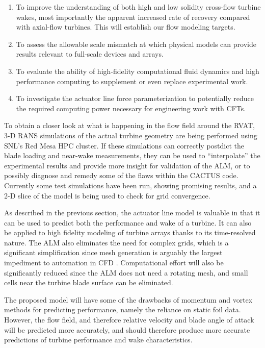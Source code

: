 \begin{enumerate}

	\item To improve the understanding of both high and low solidity cross-flow
    turbine wakes, most importantly the apparent increased rate of recovery
    compared with axial-flow turbines. This will establish our flow modeling
    targets.
	
	\item To assess the allowable scale mismatch at which physical models can
	provide results relevant to full-scale devices and arrays.
	
	\item To evaluate the ability of high-fidelity computational fluid dynamics and
	high performance computing to supplement or even replace experimental work.
    
    \item To investigate the actuator line force parameterization to potentially
    reduce the required computing power necessary for engineering work with
    CFTs.
\end{enumerate}

To obtain a closer look at what is happening in the flow field around the RVAT,
3-D RANS simulations of the actual turbine geometry are being performed using
SNL's Red Mesa HPC cluster. If these simulations can correctly postdict the
blade loading and near-wake measurements, they can be used to ``interpolate''
the experimental results and provide more insight for validation of the ALM, or
to possibly diagnose and remedy some of the flaws within the CACTUS code.
Currently some test simulations have been run, showing promising results, and a
2-D slice of the model is being used to check for grid convergence.

As described in the previous section, the actuator line model is valuable in
that it can be used to predict both the performance and wake of a turbine. It
can also be applied to high fidelity modeling of turbine arrays thanks to its
time-resolved nature. The ALM also eliminates the need for complex grids, which
is a significant simplification since mesh generation is arguably the largest
impediment to automation in CFD \cite{Slotnick2014}. Computational effort will
also be significantly reduced since the ALM does not need a rotating mesh, and
small cells near the turbine blade surface can be eliminated.

The proposed model will have some of the drawbacks of momentum and vortex
methods for predicting performance, namely the reliance on static foil data.
However, the flow field, and therefore relative velocity and blade angle of
attack will be predicted more accurately, and should therefore produce more
accurate predictions of turbine performance and wake characteristics.

